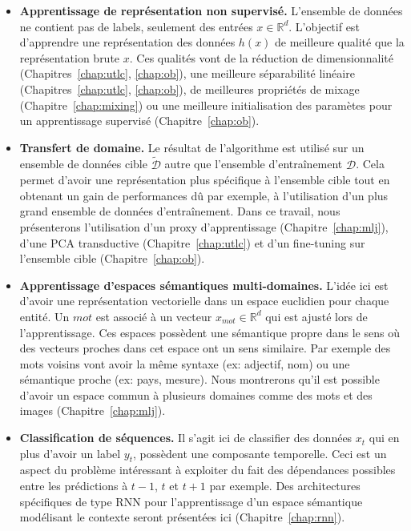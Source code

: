 \begin{itemize}

\item {\bf Apprentissage de représentation non supervisé.} L'ensemble de
données ne contient pas de labels, seulement des entrées $x\in\mathbb{R}^{d}$.
L'objectif est d'apprendre une représentation des données $h(x)$ de meilleure
qualité que la représentation brute $x$.  Ces qualités vont de la réduction de
dimensionnalité (Chapitres~\ref{chap:utlc}, \ref{chap:ob}), une meilleure
séparabilité linéaire (Chapitres~\ref{chap:utlc}, \ref{chap:ob}), de meilleures
propriétés de mixage (Chapitre~\ref{chap:mixing}) ou une meilleure
initialisation des paramètes pour un apprentissage supervisé
(Chapitre~\ref{chap:ob}). 
\\

\item {\bf Transfert de domaine.} Le résultat de l'algorithme est utilisé sur
un ensemble de données cible $\tilde{\mathcal{D}}$ autre que l'ensemble
d'entraînement $\mathcal{D}$. Cela permet d'avoir une représentation plus
spécifique à l'ensemble cible tout en obtenant un gain de performances dû par
exemple, à l'utilisation d'un plus grand ensemble de données d'entraînement.
Dans ce travail, nous présenterons l'utilisation d'un proxy d'apprentissage
(Chapitre~\ref{chap:mlj}), d'une PCA transductive (Chapitre~\ref{chap:utlc}) et
d'un fine-tuning sur l'ensemble cible (Chapitre~\ref{chap:ob}).
\\

\item {\bf Apprentissage d'espaces sémantiques multi-domaines.} L'idée ici est
d'avoir une représentation vectorielle dans un espace euclidien pour chaque entité. Un
$mot$ est associé à un vecteur $x_{mot}\in\mathbb{R}^{d}$ qui est ajusté lors de l'apprentissage.
Ces espaces possèdent une sémantique propre dans le sens où des vecteurs proches
dans cet espace ont un sens similaire. Par exemple des mots voisins vont avoir
la même syntaxe (ex: adjectif, nom) ou une sémantique proche (ex: pays, mesure).
Nous montrerons qu'il est possible d'avoir un espace commun à plusieurs domaines
comme des mots et des images (Chapitre~\ref{chap:mlj}).
\\

\item {\bf Classification de séquences.} Il s'agit ici de classifier des
données $x_{t}$ qui en plus d'avoir un label $y_{t}$, possèdent une composante
temporelle. Ceci est un aspect du problème intéressant à exploiter du fait des
dépendances possibles entre les prédictions à $t-1$, $t$ et $t+1$ par exemple.
Des architectures spécifiques de type RNN pour l'apprentissage d'un espace
sémantique modélisant le contexte seront présentées ici
(Chapitre~\ref{chap:rnn}).

\end{itemize}

